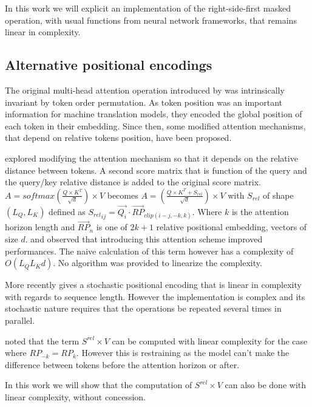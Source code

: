 In this work we will explicit an implementation of the right-side-first masked operation, with usual functions from neural network frameworks, that remains linear in complexity.

\subsection{Alternative positional encodings}

The original multi-head attention operation introduced by
\citet{vaswani2017attention} was
intrinsically invariant by token order permutation. As token position was
an important information for machine translation models, they encoded
the global position of each token in their embedding. Since then, some
modified attention mechanisms, that depend on relative tokens position,
have been proposed.

\citet{shaw2018selfattention} explored
modifying the attention mechanism so that it depends on the relative
distance between tokens. A second score matrix that is function of the
query and the query/key relative distance is added to the original score
matrix. $A = softmax\left(\frac{Q \times K^T}{\sqrt{d}}\right) \times V$ becomes
$A = \left(\frac{Q \times K^T + S_{rel}}{\sqrt{d}}\right) \times V$ with $S_{rel}$ of shape $(L_Q, L_K)$ defined as
${S_{rel}}_{ij} = \vec{Q_i} \cdotp \vec{RP}_{clip(i-j, -k, k)}$. Where $k$ is the attention horizon length and $\vec{RP}_n$ is one of
$2k+1$ relative positional embedding, vectors of size $d$.
\citet{shaw2018selfattention} and
\citet{huang2018music} observed that introducing this attention scheme improved performances.
The naive calculation of this term however has a complexity of
$O(L_QL_Kd)$. No algorithm was provided to linearize the complexity.

More recently \citet{liutkus2021relative} gives a stochastic positional encoding that is linear in
complexity with regards to sequence length. However the implementation
is complex and its stochastic nature requires that the operations be
repeated several times in parallel.

\citet{horn2021translational} noted that
the term $S^{rel} \times V$ can be computed with linear complexity for
the case where $RP_{-k} = RP_{k}$. However this is restraining as the
model can't make the difference between tokens before the attention
horizon or after.

In this work we will show that the computation of $S^{rel} \times V$
can also be done with linear complexity, without concession.

\endinput
